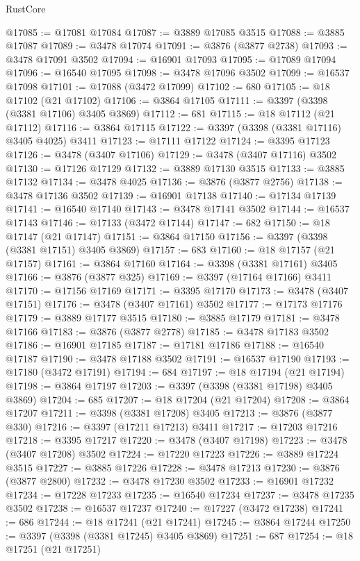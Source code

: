 \begin{lexlean}{RustCore}
\begin{coremodule}
@17085 := @17081 @17084
@17087 := @3889 @17085 @3515
@17088 := @3885 @17087
@17089 := @3478 @17074
@17091 := @3876 (@3877 @2738)
@17093 := @3478 @17091 @3502
@17094 := @16901 @17093
@17095 := @17089 @17094
@17096 := @16540 @17095
@17098 := @3478 @17096 @3502
@17099 := @16537 @17098
@17101 := @17088 (@3472 @17099)
@17102 := 680
@17105 := @18 @17102 (@21 @17102)
@17106 := @3864 @17105
@17111 := @3397 (@3398 (@3381 @17106) @3405 @3869)
@17112 := 681
@17115 := @18 @17112 (@21 @17112)
@17116 := @3864 @17115
@17122 := @3397 (@3398 (@3381 @17116) @3405 @4025) @3411
@17123 := @17111 @17122
@17124 := @3395 @17123
@17126 := @3478 (@3407 @17106)
@17129 := @3478 (@3407 @17116) @3502
@17130 := @17126 @17129
@17132 := @3889 @17130 @3515
@17133 := @3885 @17132
@17134 := @3478 @4025
@17136 := @3876 (@3877 @2756)
@17138 := @3478 @17136 @3502
@17139 := @16901 @17138
@17140 := @17134 @17139
@17141 := @16540 @17140
@17143 := @3478 @17141 @3502
@17144 := @16537 @17143
@17146 := @17133 (@3472 @17144)
@17147 := 682
@17150 := @18 @17147 (@21 @17147)
@17151 := @3864 @17150
@17156 := @3397 (@3398 (@3381 @17151) @3405 @3869)
@17157 := 683
@17160 := @18 @17157 (@21 @17157)
@17161 := @3864 @17160
@17164 := @3398 (@3381 @17161) @3405
@17166 := @3876 (@3877 @325)
@17169 := @3397 (@17164 @17166) @3411
@17170 := @17156 @17169
@17171 := @3395 @17170
@17173 := @3478 (@3407 @17151)
@17176 := @3478 (@3407 @17161) @3502
@17177 := @17173 @17176
@17179 := @3889 @17177 @3515
@17180 := @3885 @17179
@17181 := @3478 @17166
@17183 := @3876 (@3877 @2778)
@17185 := @3478 @17183 @3502
@17186 := @16901 @17185
@17187 := @17181 @17186
@17188 := @16540 @17187
@17190 := @3478 @17188 @3502
@17191 := @16537 @17190
@17193 := @17180 (@3472 @17191)
@17194 := 684
@17197 := @18 @17194 (@21 @17194)
@17198 := @3864 @17197
@17203 := @3397 (@3398 (@3381 @17198) @3405 @3869)
@17204 := 685
@17207 := @18 @17204 (@21 @17204)
@17208 := @3864 @17207
@17211 := @3398 (@3381 @17208) @3405
@17213 := @3876 (@3877 @330)
@17216 := @3397 (@17211 @17213) @3411
@17217 := @17203 @17216
@17218 := @3395 @17217
@17220 := @3478 (@3407 @17198)
@17223 := @3478 (@3407 @17208) @3502
@17224 := @17220 @17223
@17226 := @3889 @17224 @3515
@17227 := @3885 @17226
@17228 := @3478 @17213
@17230 := @3876 (@3877 @2800)
@17232 := @3478 @17230 @3502
@17233 := @16901 @17232
@17234 := @17228 @17233
@17235 := @16540 @17234
@17237 := @3478 @17235 @3502
@17238 := @16537 @17237
@17240 := @17227 (@3472 @17238)
@17241 := 686
@17244 := @18 @17241 (@21 @17241)
@17245 := @3864 @17244
@17250 := @3397 (@3398 (@3381 @17245) @3405 @3869)
@17251 := 687
@17254 := @18 @17251 (@21 @17251)

\end{coremodule}
\end{lexlean}
